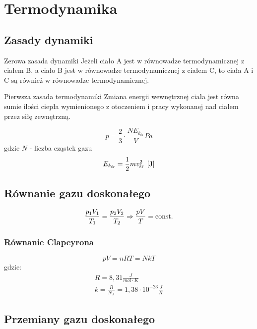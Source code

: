 \chapter{Termodynamika}

\section{Zasady dynamiki}

\begin{law}{Zerowa zasada dynamiki}
  Jeżeli ciało A jest w równowadze termodynamicznej z ciałem B, a ciało B jest w równowadze
  termodynamicznej z ciałem C, to ciała A i C są również w równowadze termodynamicznej.
\end{law}

\begin{law}{Pierwsza zasada termodynamiki}
  Zmiana energii wewnętrznej ciała jest równa sumie ilości ciepła wymienionego z otoczeniem i pracy
  wykonanej nad ciałem przez siłę zewnętrzną.
\end{law}

\begin{equation*}
  p = \frac 2 3 \cdot \frac{NE_{k_\text{śr}}}{V} \unit{Pa}
\end{equation*}
gdzie $N$ - liczba cząstek gazu
\begin{equation*}
  E_{k_\text{śr}} = \frac 1 2 mv_\text{śr}^2 \;\left[\mathrm{J}\right]
\end{equation*}

\section{Równanie gazu doskonałego}
\begin{equation*}
  \frac{p_1 V_1}{T_1} = \frac{p_2 V_2}{T_2} \Rightarrow \frac{pV}{T} = \operatorname{const.}
\end{equation*}

\subsection{Równanie Clapeyrona}
\begin{equation}
  pV = nRT = NkT
\end{equation}
gdzie:
\begin{gather*}
  R =  8,31 \unit{\frac{J}{mol \cdot K}}\\
  k = \frac{R}{N_A} = 1,38 \cdot 10^{-23} \unit{\frac J K}
\end{gather*}

\section{Przemiany gazu doskonałego}

